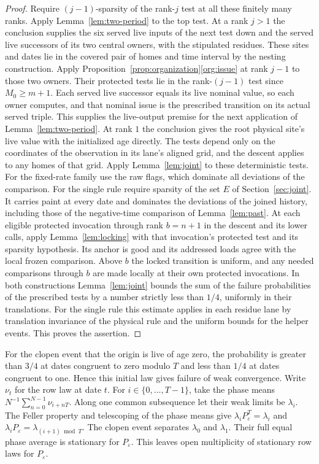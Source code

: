 \begin{proof}
Require \((j-1)\)-sparsity of the rank-\(j\) test at all these finitely many ranks. Apply Lemma~\ref{lem:two-period} to the top test. At a rank \(j>1\) the conclusion supplies the six served live inputs of the next test down and the served live successors of its two central owners, with the stipulated residues. These sites and dates lie in the covered pair of homes and time interval by the nesting construction. Apply Proposition~\ref{prop:organization}\ref{org:issue} at rank \(j-1\) to those two owners. Their protected tests lie in the rank-\((j-1)\) test since \(M_0\ge m+1\). Each served live successor equals its live nominal value, so each owner computes, and that nominal issue is the prescribed transition on its actual served triple. This supplies the live-output premise for the next application of Lemma~\ref{lem:two-period}. At rank \(1\) the conclusion gives the root physical site's live value with the initialized age directly. The tests depend only on the coordinates of the observation in its lane's aligned grid, and the descent applies to any homes of that grid. Apply Lemma~\ref{lem:joint} to these deterministic tests. For the fixed-rate family use the raw flags, which dominate all deviations of the comparison. For the single rule require sparsity of the set \(E\) of Section~\ref{sec:joint}. It carries paint at every date and dominates the deviations of the joined history, including those of the negative-time comparison of Lemma~\ref{lem:past}. At each eligible protected invocation through rank \(b=n+1\) in the descent and its lower calls, apply Lemma~\ref{lem:locking} with that invocation's protected test and its sparsity hypothesis. Its anchor is good and its addressed loads agree with the local frozen comparison. Above \(b\) the locked transition is uniform, and any needed comparisons through \(b\) are made locally at their own protected invocations. In both constructions Lemma~\ref{lem:joint} bounds the sum of the failure probabilities of the prescribed tests by a number strictly less than \(1/4\), uniformly in their translations. For the single rule this estimate applies in each residue lane by translation invariance of the physical rule and the uniform bounds for the helper events. This proves the assertion.
\end{proof}

For the clopen event that the origin is live of age zero, the probability is greater than \(3/4\) at dates congruent to zero modulo \(T\) and less than \(1/4\) at dates congruent to one. Hence this initial law gives failure of weak convergence. Write \(\nu_t\) for the row law at date \(t\). For \(i\in\{0,\ldots,T-1\}\), take the phase means \(N^{-1}\sum_{n=0}^{N-1}\nu_{i+nT}\). Along one common subsequence let their weak limits be \(\lambda_i\). The Feller property and telescoping of the phase means give \(\lambda_iP_\varepsilon^T=\lambda_i\) and \(\lambda_iP_\varepsilon=\lambda_{(i+1)\bmod T}\). The clopen event separates \(\lambda_0\) and \(\lambda_1\). Their full equal phase average is stationary for \(P_\varepsilon\). This leaves open multiplicity of stationary row laws for \(P_\varepsilon\).

